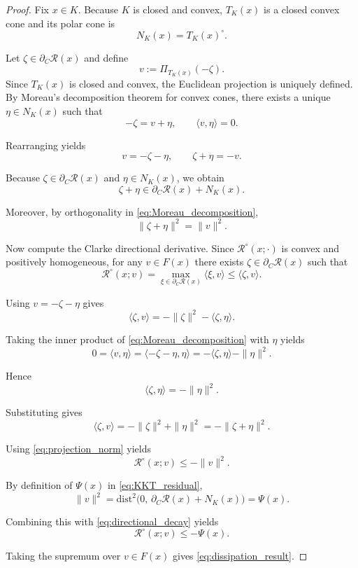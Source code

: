 \documentclass[12pt]{article}
\theoremstyle{plain}
\theoremstyle{definition}
\theoremstyle{remark}
\begin{document}
\begin{proof}
Fix $x\in K$.
Because $K$ is closed and convex,
$T_K(x)$ is a closed convex cone and its polar cone is
\[
N_K(x)=T_K(x)^\circ .
\]

Let $\zeta\in\partial_C\mathcal R(x)$ and define
\[
v := \Pi_{T_K(x)}(-\zeta).
\]
Since $T_K(x)$ is closed and convex,
the Euclidean projection is uniquely defined. By Moreau's decomposition theorem for convex cones,
there exists a unique $\eta\in N_K(x)$ such that
\begin{equation}
-\zeta = v+\eta,
\qquad
\langle v,\eta\rangle = 0.
\label{eq:Moreau_decomposition}
\end{equation}

Rearranging yields
\[
v=-\zeta-\eta,
\qquad
\zeta+\eta=-v.
\]

Because $\zeta\in\partial_C\mathcal R(x)$ and $\eta\in N_K(x)$,
we obtain
\[
\zeta+\eta \in \partial_C\mathcal R(x)+N_K(x).
\]

Moreover, by orthogonality in
\eqref{eq:Moreau_decomposition},
\begin{equation}
\|\zeta+\eta\|^2=\|v\|^2 .
\label{eq:projection_norm}
\end{equation}

Now compute the Clarke directional derivative.
Since $\mathcal R^\circ(x;\cdot)$ is convex and positively homogeneous,
for any $v\in F(x)$ there exists $\zeta\in\partial_C\mathcal R(x)$
such that
\[
\mathcal R^\circ(x;v)
=
\max_{\xi\in\partial_C\mathcal R(x)}
\langle \xi,v\rangle
\le
\langle \zeta,v\rangle .
\]

Using $v=-\zeta-\eta$ gives
\[
\langle\zeta,v\rangle
=
-\|\zeta\|^2-\langle\zeta,\eta\rangle .
\]

Taking the inner product of
\eqref{eq:Moreau_decomposition}
with $\eta$ yields
\[
0
=
\langle v,\eta\rangle
=
\langle -\zeta-\eta,\eta\rangle
=
-\langle\zeta,\eta\rangle-\|\eta\|^2 .
\]

Hence
\[
\langle\zeta,\eta\rangle=-\|\eta\|^2 .
\]

Substituting gives
\[
\langle\zeta,v\rangle
=
-\|\zeta\|^2+\|\eta\|^2
=
-\|\zeta+\eta\|^2 .
\]

Using \eqref{eq:projection_norm} yields
\begin{equation}
\mathcal R^\circ(x;v)\le -\|v\|^2 .
\label{eq:directional_decay}
\end{equation}

By definition of $\Psi(x)$ in \eqref{eq:KKT_residual},
\[
\|v\|^2
=
\mathrm{dist}^2\!\big(
0,\,
\partial_C\mathcal R(x)+N_K(x)
\big)
=
\Psi(x).
\]

Combining this with \eqref{eq:directional_decay}
yields
\[
\mathcal R^\circ(x;v)
\le
-\Psi(x).
\]

Taking the supremum over $v\in F(x)$ gives
\eqref{eq:dissipation_result}.
\end{proof}
\end{document}
